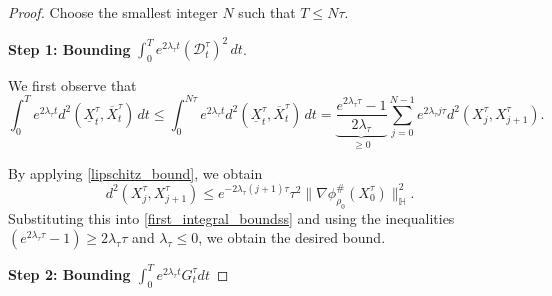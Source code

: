\documentclass[11pt,a4paper]{amsart}
\newcommand{\1}{\mathds{1}}
\numberwithin{equation}{section}
\begin{document}
\begin{proof}

Choose the smallest integer $N$ such that $T \leq N \tau$. \smallskip 

\noindent \textbf{Step 1: Bounding } $\displaystyle \int_0^T e^{2 \lambda_{\tau} t} (\mathcal{D}_t^{\tau})^2\,dt$.

We first observe that
\begin{equation}
\int_0^T e^{2\lambda_{\tau} t} d^2(\underline{X}_t^{\tau},\overline{X}^{\tau}_t)\,dt 
\leq \int_0^{N \tau} e^{2\lambda_{\tau} t} d^2(\underline{X}_t^{\tau},\overline{X}^{\tau}_t)\,dt 
= \underbrace{\frac{e^{2\lambda_{\tau} \tau} - 1}{2 \lambda_{\tau}}}_{\geq 0} \sum_{j=0}^{N-1} e^{2 \lambda_{\tau} j \tau} d^2(X^{\tau}_j,X^{\tau}_{j+1}).
\label{first_integral_boundss}
\end{equation} 

\noindent By applying \eqref{lipschitz_bound}, we obtain
\begin{equation}
d^2(X^{\tau}_j,X^{\tau}_{j+1}) \leq e^{-2\lambda_{\tau} (j+1) \tau} \tau^2 \|\nabla \phi^{\#}_{\rho_0}(X_0^{\tau})\|^2_{\mathbb{H}}. \label{distance_bounds123}
\end{equation}
Substituting this into \eqref{first_integral_boundss} and using the inequalities $(e^{2 \lambda_{\tau} \tau} - 1) \geq 2\lambda_{\tau} \tau$ and $\lambda_{\tau} \leq 0$, we obtain the desired bound. \smallskip

\noindent \textbf{Step 2: Bounding $\int_0^T e^{2 \lambda_{\tau}t} G^{\tau}_t dt$}  \smallskip


\end{proof}
\end{document}
